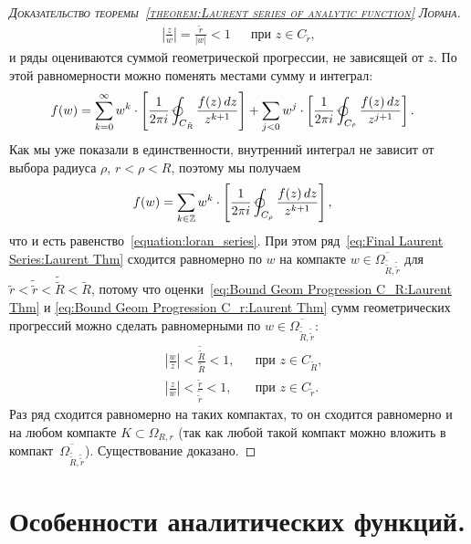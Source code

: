 \documentclass[../complex-analysis.tex]{subfiles}
\begin{document}
\begin{proof}[\normalfont\textsc{Доказательство теоремы~\ref{theorem:Laurent series of analytic function} Лорана}]
\begin{align}
  \label{eq:Bound Geom Progression C_r:Laurent Thm} \left| \frac{z}{w} \right| = \frac{\tilde r}{\left| w \right|} < 1 &&\text{при } z \in C_{\tilde r},
 \end{align} и ряды оцениваются суммой геометрической прогрессии, не зависящей от $ z $. По этой равномерности можно поменять местами сумму и интеграл:
 \begin{align*}
  f(w) &= \sum_{k=0}^{\infty} w^{k} \cdot \left[ \frac{1}{2\pi i} \varointctrclockwise_{C_{\tilde R}} \frac{f(z)\,dz}{z^{k+1}} \right] + \sum_{j < 0} w^{j} \cdot \left[ \frac{1}{2\pi i} \varointctrclockwise_{C_{\tilde r}} \frac{f(z)\,dz}{z^{j+1}} \right].
 \end{align*} Как мы уже показали в единственности, внутренний интеграл не зависит от выбора радиуса $ \rho $, $ r < \rho < R $, поэтому мы получаем 
 \begin{align}
  \label{eq:Final Laurent Series:Laurent Thm}
  f(w) &= \sum_{k \in \Z} w^{k} \cdot \left[ \frac{1}{2\pi i} \varointctrclockwise_{C_\rho} \frac{f(z)\,dz}{z^{k+1}} \right],
 \end{align} что и есть равенство~\eqref{equation:loran_series}. При этом ряд~\eqref{eq:Final Laurent Series:Laurent Thm} сходится равномерно по $ w $ на компакте $ w \in \overline{\Omega_{\tilde {\tilde R}, \tilde {\tilde r}}} $ для $ \tilde r < \tilde{\tilde r} < \tilde{\tilde R} < \tilde R $, потому что оценки~\eqref{eq:Bound Geom Progression C_R:Laurent Thm} и \eqref{eq:Bound Geom Progression C_r:Laurent Thm} сумм геометрических прогрессий можно сделать равномерными по $ w \in \overline{\Omega_{\tilde{\tilde R},\tilde{\tilde r}}} $:
 \begin{align*}
  &\left| \frac{w}{z} \right| < \frac{\tilde {\tilde R}}{\tilde R} < 1, &&\text{при } z \in C_{\tilde R},\\
  &\left| \frac{z}{w} \right| < \frac{\tilde r}{\tilde{\tilde r}} < 1, &&\text{при } z \in C_{\tilde r}.
 \end{align*} Раз ряд сходится равномерно на таких компактах, то он сходится равномерно и на любом компакте $ K \subset \Omega_{R,r} $ (так как любой такой компакт можно вложить в компакт~$ \overline{\Omega_{\tilde{\tilde R}, \tilde{\tilde r}}} $). Существование доказано.
\end{proof}

\newpage
\section{Особенности аналитических функций.}
\end{document}
